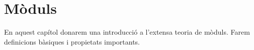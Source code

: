 \documentclass[../../main.tex]{subfiles}
\begin{document}
\chapter{Mòduls}

En aquest capítol donarem una introducció a l'extensa teoria de mòduls. Farem definicions bàsiques i propietats importants.
\end{document}
